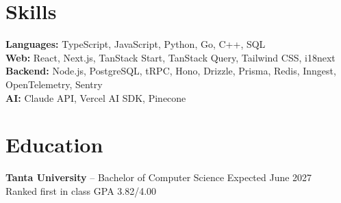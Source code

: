 \documentclass[11pt]{article}       %
\begin{document}
\vspace{-18.5pt}
\section*{Skills}
\textbf{Languages:} TypeScript, JavaScript, Python, Go, C++, SQL \\
\textbf{Web:} React, Next.js, TanStack Start, TanStack Query, Tailwind CSS, i18next \\
\textbf{Backend:} Node.js, PostgreSQL, tRPC, Hono, Drizzle, Prisma, Redis, Inngest, OpenTelemetry, Sentry \\
\textbf{AI:} Claude API, Vercel AI SDK, Pinecone \\

\vspace{-6.5pt}

\section*{Education}
\textbf{Tanta University} -- Bachelor of Computer Science \hfill Expected June 2027 \\
Ranked first in class \hfill GPA 3.82/4.00 \\
\end{document}
